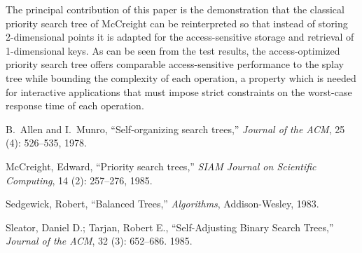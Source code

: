 \documentclass{article}
\begin{document}
The principal contribution of this paper is the demonstration that the classical priority search tree of McCreight can be reinterpreted so that instead of storing 2-dimensional points it is adapted for the access-sensitive storage and retrieval of 1-dimensional keys. As can be seen from the test results, the access-optimized priority search tree offers comparable access-sensitive performance to the splay tree while bounding the complexity of each operation, a property which is needed for interactive applications that must impose strict constraints on the worst-case response time of each operation.  




\begin{thebibliography}{9}

B.\ Allen and I.\ Munro, ``Self-organizing search trees,'' {\em Journal of the ACM}, 25 (4): 526–535, 1978.

McCreight, Edward, ``Priority search trees,'' {\em SIAM Journal on Scientific Computing}, 14 (2): 257–276, 1985.

Sedgewick, Robert, ``Balanced Trees,'' {\em Algorithms}, Addison-Wesley, 1983.

Sleator, Daniel D.; Tarjan, Robert E., ``Self-Adjusting Binary Search Trees,'' {\em Journal of the ACM}, 32 (3): 652–686. 1985.

\end{thebibliography}
\end{document}
